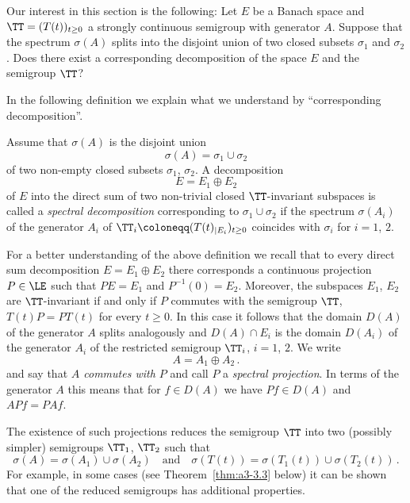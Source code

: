 Our interest in this section is the following: Let $E$ be a Banach space and $\TT = (T(t))_{t \geq 0}$ a strongly continuous semigroup with generator $A$.
Suppose that the spectrum $\sigma(A)$ splits into the disjoint union of two closed subsets $\sigma_{1}$ and $\sigma_{2}$.
Does there exist a corresponding decomposition of the space $E$ and the semigroup $\TT$?

In the following definition we explain what we understand by \enquote{corresponding decomposition}.
\begin{definition}\label{def:a3-3.1}
Assume that $\sigma(A)$ is the disjoint union
\[
\sigma(A) = \sigma_{1} \cup \sigma_{2}
\]
of two non-empty closed subsets $\sigma_{1}$, $\sigma_{2}$.
A decomposition
\[
E = E_{1} \oplus E_{2}
\]
of $E$ into the direct sum of two non-trivial closed $\TT$-invariant subspaces is called a \emph{spectral decomposition} corresponding to $\sigma_{1} \cup \sigma_{2}$ if the spectrum $\sigma(A_{i})$ of the generator $A_{i}$ of $\TT_{i} \coloneqq (T(t)_{|E_{i}})_{t \geq 0}$ coincides with $\sigma_{i}$ for $i = 1$, $2$.
\end{definition}
For a better understanding of the above definition we recall that to every direct sum decomposition $E = E_{1} \oplus E_{2}$ there corresponds a continuous projection $P \in \LE$ such that $PE = E_{1}$ and $P^{-1}(0) = E_{2}$.
Moreover, the subspaces $E_{1}$, $E_{2}$ are $\TT$-invariant if and only if $P$ commutes with the semigroup $\TT$, \ie $T(t)P = PT(t)$ for every $t \geq 0$.
In this case it follows that the domain $D(A)$ of the generator $A$ splits analogously and $D(A) \cap E_{i}$ is the domain $D(A_{i})$ of the generator $A_{i}$ of the restricted semigroup $\TT_{i}$, $i = 1$, $2$.
We write
\[
A = A_{1} \oplus A_{2}\,.
\]
and say that \emph{$A$ commutes with $P$} and call $P$ a \emph{spectral projection}.
In terms of the generator $A$ this means that for $f \in D(A)$ we have $Pf \in D(A)$ and $APf = PAf$.

The existence of such projections reduces the semigroup $\TT$ into two (possibly simpler) semigroups $\TT_{1}$, $\TT_{2}$ such that
\[
\sigma(A) = \sigma(A_{1}) \cup \sigma(A_{2}) \quad \text{and} \quad \sigma(T(t)) = \sigma(T_{1}(t)) \cup \sigma(T_{2}(t))\,.
\]
For example, in some cases (see Theorem~\ref{thm:a3-3.3} below) it can be shown that one of the reduced semigroups has additional properties.

